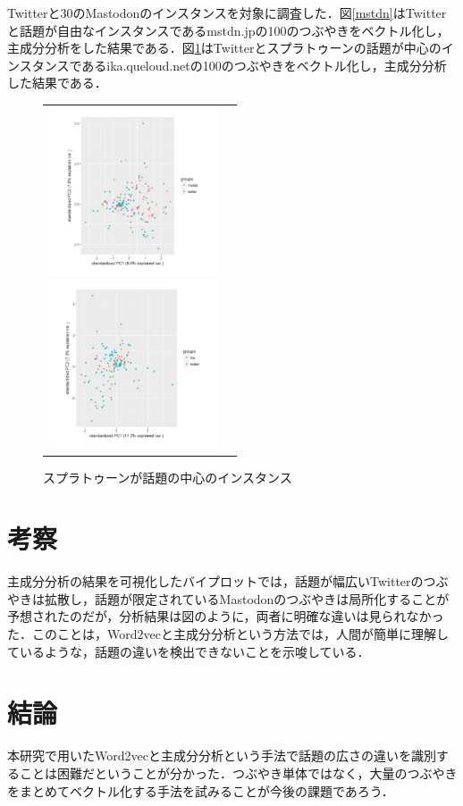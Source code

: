 \documentclass[uplatex,twocolumn,dvipdfmx]{jsarticle}
\begin{document}
Twitterと30のMastodonのインスタンスを対象に調査した．図\ref{mstdn}はTwitterと話題が自由なインスタンスであるmstdn.jpの100のつぶやきをベクトル化し，主成分分析をした結果である．図\ref{ika}はTwitterとスプラトゥーンの話題が中心のインスタンスであるika.queloud.netの100のつぶやきをベクトル化し，主成分分析した結果である．
\vspace{-1.5zh}
\begin{figure}[h]
\begin{tabular}{cc}
\begin{minipage}{0.5\hsize}
\begin{center}
\includegraphics[width=50mm,clip]{mstdn.pdf}
\caption{話題が自由なインスタンス}
\label{mstdn}
\end{center}
\end{minipage}
\begin{minipage}{0.5\hsize}
\begin{center}
\includegraphics[width=50mm,clip]{ika.pdf}
\caption{スプラトゥーンが話題の中心のインスタンス}
\label{ika}
\end{center} 
\end{minipage}
\end{tabular}
\end{figure}
\vspace{-2.5zh}
\section{考察}

主成分分析の結果を可視化したバイプロットでは，話題が幅広いTwitterのつぶやきは拡散し，話題が限定されているMastodonのつぶやきは局所化することが予想されたのだが，分析結果は図のように，両者に明確な違いは見られなかった．このことは，Word2vecと主成分分析という方法では，人間が簡単に理解しているような，話題の違いを検出できないことを示唆している．

\section{結論}

本研究で用いたWord2vecと主成分分析という手法で話題の広さの違いを識別することは困難だということが分かった．つぶやき単体ではなく，大量のつぶやきをまとめてベクトル化する手法を試みることが今後の課題であろう．



\end{document}
